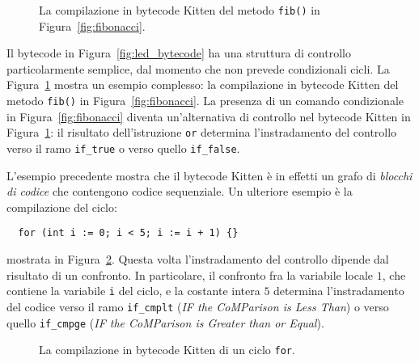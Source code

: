 \begin{figure}[t]
\begin{center}
\end{center}
\caption{La compilazione in bytecode Kitten del metodo \texttt{fib()} in Figura~\ref{fig:fibonacci}.}\label{fig:fib_bytecode}
\end{figure}
%
Il bytecode in Figura~\ref{fig:led_bytecode} ha una struttura di controllo
particolarmente semplice, dal momento che non prevede condizionali \nec cicli.
La Figura~\ref{fig:fib_bytecode} mostra un esempio \piu complesso:
la compilazione in bytecode Kitten del metodo \texttt{fib()} in
Figura~\ref{fig:fibonacci}. La presenza di un comando condizionale in
Figura~\ref{fig:fibonacci} diventa un'alternativa di controllo nel
bytecode Kitten in Figura~\ref{fig:fib_bytecode}: il risultato dell'istruzione
\texttt{or} determina l'instradamento del controllo verso il ramo
\texttt{if\_true} o verso quello \texttt{if\_false}.

L'esempio precedente mostra che il bytecode Kitten \`e in effetti un grafo
di \emph{blocchi di codice} che contengono codice
sequenziale. Un ulteriore esempio \`e la compilazione del ciclo:
%
\begin{verbatim}
  for (int i := 0; i < 5; i := i + 1) {}
\end{verbatim}
%
mostrata in Figura~\ref{fig:cycle_bytecode}. Questa volta
l'instradamento del controllo dipende dal risultato di un confronto.
In particolare, il confronto fra la variabile locale $1$, che contiene
la variabile \texttt{i} del ciclo, e la costante intera $5$ determina
l'instradamento del codice verso il ramo \texttt{if\_cmplt}
(\emph{IF the CoMParison is Less Than}) o verso quello
\texttt{if\_cmpge} (\emph{IF the CoMParison is Greater than or Equal}).
%
\begin{figure}[t]
\begin{center}
\end{center}
\caption{La compilazione in bytecode Kitten di un ciclo \texttt{for}.}\label{fig:cycle_bytecode}
\end{figure}
%
